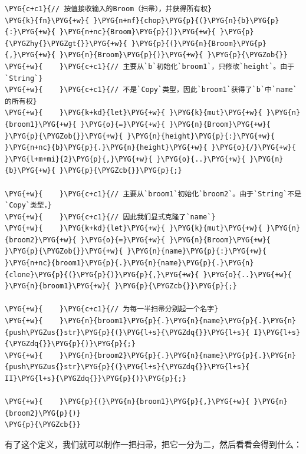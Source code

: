 \begin{Verbatim}[commandchars=\\\{\},breaklines=true,breakanywhere=true,fontsize=\codefont,xleftmargin=17bp]
\PYG{c+c1}{// 按值接收输入的Broom（扫帚），并获得所有权}
\PYG{k}{fn}\PYG{+w}{ }\PYG{n+nf}{chop}\PYG{p}{(}\PYG{n}{b}\PYG{p}{:}\PYG{+w}{ }\PYG{n+nc}{Broom}\PYG{p}{)}\PYG{+w}{ }\PYG{p}{\PYGZhy{}\PYGZgt{}}\PYG{+w}{ }\PYG{p}{(}\PYG{n}{Broom}\PYG{p}{,}\PYG{+w}{ }\PYG{n}{Broom}\PYG{p}{)}\PYG{+w}{ }\PYG{p}{\PYGZob{}}
\PYG{+w}{    }\PYG{c+c1}{// 主要从`b`初始化`broom1`，只修改`height`。由于`String`}
\PYG{+w}{    }\PYG{c+c1}{// 不是`Copy`类型，因此`broom1`获得了`b`中`name`的所有权}
\PYG{+w}{    }\PYG{k+kd}{let}\PYG{+w}{ }\PYG{k}{mut}\PYG{+w}{ }\PYG{n}{broom1}\PYG{+w}{ }\PYG{o}{=}\PYG{+w}{ }\PYG{n}{Broom}\PYG{+w}{ }\PYG{p}{\PYGZob{}}\PYG{+w}{ }\PYG{n}{height}\PYG{p}{:}\PYG{+w}{ }\PYG{n+nc}{b}\PYG{p}{.}\PYG{n}{height}\PYG{+w}{ }\PYG{o}{/}\PYG{+w}{ }\PYG{l+m+mi}{2}\PYG{p}{,}\PYG{+w}{ }\PYG{o}{..}\PYG{+w}{ }\PYG{n}{b}\PYG{+w}{ }\PYG{p}{\PYGZcb{}}\PYG{p}{;}

\PYG{+w}{    }\PYG{c+c1}{// 主要从`broom1`初始化`broom2`。由于`String`不是`Copy`类型，}
\PYG{+w}{    }\PYG{c+c1}{// 因此我们显式克隆了`name`}
\PYG{+w}{    }\PYG{k+kd}{let}\PYG{+w}{ }\PYG{k}{mut}\PYG{+w}{ }\PYG{n}{broom2}\PYG{+w}{ }\PYG{o}{=}\PYG{+w}{ }\PYG{n}{Broom}\PYG{+w}{ }\PYG{p}{\PYGZob{}}\PYG{+w}{ }\PYG{n}{name}\PYG{p}{:}\PYG{+w}{ }\PYG{n+nc}{broom1}\PYG{p}{.}\PYG{n}{name}\PYG{p}{.}\PYG{n}{clone}\PYG{p}{(}\PYG{p}{)}\PYG{p}{,}\PYG{+w}{ }\PYG{o}{..}\PYG{+w}{ }\PYG{n}{broom1}\PYG{+w}{ }\PYG{p}{\PYGZcb{}}\PYG{p}{;}

\PYG{+w}{    }\PYG{c+c1}{// 为每一半扫帚分别起一个名字}
\PYG{+w}{    }\PYG{n}{broom1}\PYG{p}{.}\PYG{n}{name}\PYG{p}{.}\PYG{n}{push\PYGZus{}str}\PYG{p}{(}\PYG{l+s}{\PYGZdq{}}\PYG{l+s}{ I}\PYG{l+s}{\PYGZdq{}}\PYG{p}{)}\PYG{p}{;}
\PYG{+w}{    }\PYG{n}{broom2}\PYG{p}{.}\PYG{n}{name}\PYG{p}{.}\PYG{n}{push\PYGZus{}str}\PYG{p}{(}\PYG{l+s}{\PYGZdq{}}\PYG{l+s}{ II}\PYG{l+s}{\PYGZdq{}}\PYG{p}{)}\PYG{p}{;}

\PYG{+w}{    }\PYG{p}{(}\PYG{n}{broom1}\PYG{p}{,}\PYG{+w}{ }\PYG{n}{broom2}\PYG{p}{)}
\PYG{p}{\PYGZcb{}}
\end{Verbatim}

有了这个定义，我们就可以制作一把扫帚，把它一分为二，然后看看会得到什么：

